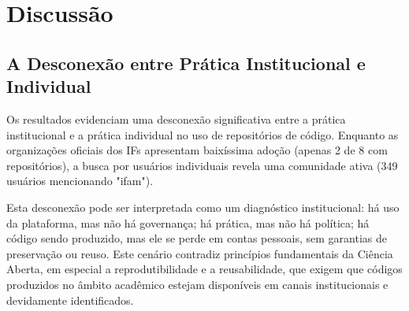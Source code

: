 \documentclass[english, spanish, brazilian]{RBIEarticle}
\begin{document}
%
%


\section{Discussão}

\subsection{A Desconexão entre Prática Institucional e Individual}

Os resultados evidenciam uma desconexão significativa entre a prática institucional e a prática individual no uso de repositórios de código. Enquanto as organizações oficiais dos IFs apresentam baixíssima adoção (apenas 2 de 8 com repositórios), a busca por usuários individuais revela uma comunidade ativa (349 usuários mencionando "ifam").

Esta desconexão pode ser interpretada como um diagnóstico institucional: há uso da plataforma, mas não há governança; há prática, mas não há política; há código sendo produzido, mas ele se perde em contas pessoais, sem garantias de preservação ou reuso. Este cenário contradiz princípios fundamentais da Ciência Aberta, em especial a reprodutibilidade e a reusabilidade, que exigem que códigos produzidos no âmbito acadêmico estejam disponíveis em canais institucionais e devidamente identificados.
\end{document}
